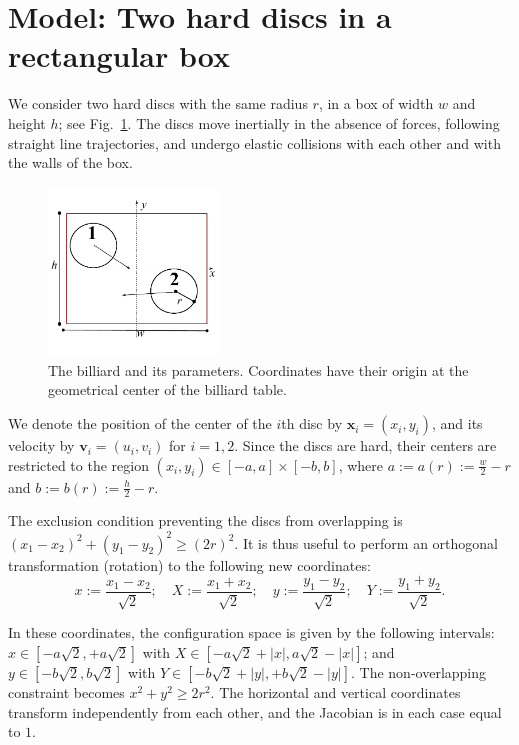 \documentclass[superscriptaddress,pre,reprint,showpacs,onecolumn]{revtex4-1}
\newcommand{\defeq}{:=}
\begin{document}
\section{Model: Two hard discs in a rectangular box}

We consider two hard discs with the same radius $r$,
in a box of width $w$ and height $h$; see Fig.~\ref{billar01}. 
The discs move inertially in the absence of forces, 
following straight line trajectories,
and undergo elastic collisions with each 
other and with the walls of the box.

\begin{figure}[h]
  \begin{center}
  \includegraphics[width=0.40\textwidth]{FigurasPerfectas/DiscosenCajaCuadrada01.pdf}
  \end{center}
  \caption{The billiard and its parameters. Coordinates
    have their origin at the geometrical center of the 
    billiard table.}\label{billar01}
\end{figure}


We denote the position of the center of the $i$th disc by 
$\mathbf{x}_i = (x_i, y_i)$, and its velocity by $\mathbf{v}_i = (u_i, v_i)$ for $i=1,2$. Since the discs are hard, 
their centers are restricted to the region 
$(x_i, y_i) \in [-a,a] \times [-b, b]$, where 
$a \defeq a(r) \defeq \frac{w}{2} - r $ and
$b \defeq b(r) \defeq \frac{h}{2} - r $.

The exclusion condition preventing the discs from overlapping is $(x_1-x_2)^2 + (y_1-y_2)^2 \ge (2r)^2$.
It is thus useful to perform an orthogonal transformation (rotation) to the following new coordinates:
\begin{equation}\label{cambiocoor01}
 x \defeq \frac{x_1 - x_2}{\sqrt{2}}; 
\quad X \defeq \frac{x_1 + x_2}{\sqrt{2}}; 
\quad y \defeq \frac{y_1 - y_2}{\sqrt{2}}; 
\quad Y \defeq \frac{y_1 + y_2}{\sqrt{2}}.
\end{equation}

In these coordinates, the configuration space is given by the following
intervals:
$x \in [-a \sqrt{2}, +a \sqrt{2}]$ with 
$X \in [-a \sqrt{2} + |x|, a \sqrt{2} - |x|]$; and 
 $y \in [-b \sqrt{2}, b \sqrt{2}]$ with $Y \in [-b \sqrt{2} + |y|, +b \sqrt{2} - |y|]$.
The non-overlapping constraint becomes $x^2 + y^2 \ge 2 r^2$.
The horizontal and vertical coordinates transform independently
from each other, and the Jacobian is in each case equal to $1$.
\end{document}
